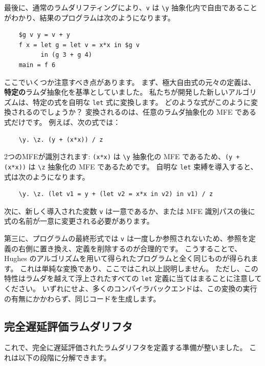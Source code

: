 \documentclass{jbook}
\begin{document}
最後に、通常のラムダリフティングにより、\texttt{v} は \texttt{\textbackslash y} 抽象化内で自由であることがわかり、結果のプログラムは次のようになります。

\begin{verbatim}
	$g v y = v + y
	f x = let g = let v = x*x in $g v
	      in (g 3 + g 4)
	main = f 6
\end{verbatim}

ここでいくつか注意すべき点があります。
まず、極大自由式の元々の定義は、\textbf{特定の}ラムダ抽象化を基準としていました。
私たちが開発した新しいアルゴリズムは、特定の式を自明な \texttt{let} 式に変換します。
どのような式がこのように変換されるのでしょうか？
変換されるのは、任意のラムダ抽象化の MFE である式だけです。
例えば、次の式では：

\begin{verbatim}
	\y. \z. (y + (x*x)) / z
\end{verbatim}

2つのMFEが識別されます: \texttt{(x*x)} は \texttt{\textbackslash y} 抽象化の MFE であるため、\texttt{(y + (x*x))} は \texttt{\textbackslash z} 抽象化の MFE であるためです。
自明な \texttt{let} 束縛を導入すると、式は次のようになります。

\begin{verbatim}
	\y. \z. (let v1 = y + (let v2 = x*x in v2) in v1) / z
\end{verbatim}

次に、新しく導入された変数 \texttt{v} は一意であるか、または MFE 識別パスの後に式の名前が一意に変更される必要があります。

第三に、プログラムの最終形式では \texttt{v} は一度しか参照されないため、参照を定義の右側に置き換え、定義を削除するのが合理的です。
こうすることで、Hughes のアルゴリズムを用いて得られたプログラムと全く同じものが得られます。
これは単純な変換であり、ここではこれ以上説明しません。
ただし、この特性はラムダを越えて浮上されたすべての \texttt{let} 定義に当てはまることに注意してください。
いずれにせよ、多くのコンパイラバックエンドは、この変換の実行の有無にかかわらず、同じコードを生成します。

\subsection{完全遅延評価ラムダリフタ}

これで、完全に遅延評価されたラムダリフタを定義する準備が整いました。
これは以下の段階に分解できます。
\end{document}
